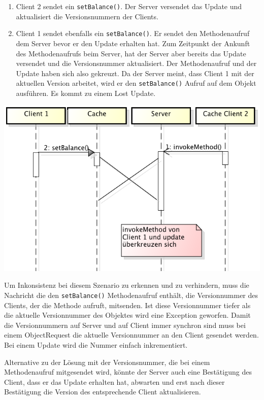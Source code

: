 \begin{enumerate}
\item Client 2 sendet ein \verb|setBalance()|. Der Server versendet das Update und aktualisiert die Versionsnummern der Clients.
\item Client 1 sendet ebenfalls ein \verb|setBalance()|. Er sendet den Methodenaufruf dem Server bevor er den Update erhalten hat. Zum Zeitpunkt der Ankunft des Methodenaufrufs beim Server, hat der Server aber bereits das Update versendet und die Versionsnummer aktualisiert. Der Methodenaufruf und der Update haben sich also gekreuzt. Da der Server meint, dass Client 1 mit der aktuellen Version arbeitet, wird er den \verb|setBalance()| Aufruf auf dem Objekt ausführen. Es kommt zu einem Lost Update.
\end{enumerate}

\includegraphics[scale=0.3]{images_objectcaching/conflictCross}

Um Inkonsistenz bei diesem Szenario zu erkennen und zu verhindern, muss die Nachricht die den \verb|setBalance()| Methodenaufruf enthält, die Versionnummer des Clients, der die Methode aufruft, mitsenden. Ist diese Versionnummer tiefer als die aktuelle Versionnummer des Objektes wird eine Exception geworfen. Damit die Versionnummern auf Server und auf Client immer synchron sind muss bei einem ObjectRequest die aktuelle Versionnummer an den Client gesendet werden. Bei einem Update wird die Nummer einfach inkrementiert.

Alternative zu der Lösung mit der Versionsnummer, die bei einem Methodenaufruf mitgesendet wird, könnte der Server auch eine Bestätigung des Client, dass er das Update erhalten hat, abwarten und erst nach dieser Bestätigung die Version des entsprechende Client aktualisieren.


